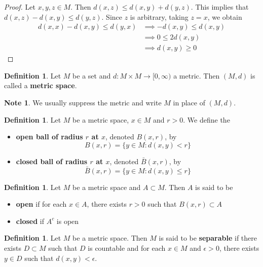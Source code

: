 \documentclass[12pt]{amsart}
\theoremstyle{definition}
\newtheorem{defn}[definition]{Definition}
\newtheorem{note}[definition]{Note}
\newcommand{\ep}{\epsilon}
\newcommand{\tbf}[1]{\textbf{#1}}
\newcommand{\Rg}{[0,\infty)}
\DeclareMathOperator*{\0}{\mbf{0}}
\DeclareMathOperator*{\1}{\mbf{1}}
\newcommand{\ld}[1]{\label{defn:#1}}
\begin{document}
	\begin{proof}
	Let $x, y, z \in M$. Then $d(x,z) \leq d(x, y) + d(y,z)$. This implies that $d(x,z) - d(x, y) \leq d(y, z)$. Since $z$ is arbitrary, taking $z=x$, we obtain 
	\begin{align*}
	d(x,x) - d(x, y) \leq d(y, x)
	& \implies - d(x, y) \leq d(x, y) \\
	& \implies 0 \leq 2 d(x,y) \\
	& \implies d(x,y) \geq 0
	\end{align*}
	\end{proof}	

	\begin{defn} \ld{}
		Let $M$ be a set and $d: M \times M \rightarrow \Rg$ a metric. Then $(M, d)$ is called a \tbf{metric space}.
	\end{defn}	
	
	\begin{note}
		We usually suppress the metric and write $M$ in place of $(M, d)$.
	\end{note}	

	\begin{defn}
		Let $M$ be a metric space, $x \in M$ and $r > 0$. We define the 
		\begin{itemize}
			\item \tbf{open ball of radius $r$ at $x$}, denoted $B(x, r)$, by $$B(x, r) = \{y \in M: d(x,y) < r\}$$
			\item \tbf{closed ball of radius $r$ at $x$}, denoted $\bar{B}(x, r)$, by $$\bar{B}(x, r) = \{y \in M: d(x,y) \leq r\}$$
		\end{itemize}
	\end{defn}

	\begin{defn}
		Let $M$ be a metric space and $A \subset M$. Then $A$ is said to be 
		\begin{itemize}
			\item \tbf{open} if for each $x \in A$, there exists $r > 0$ such that $B(x, r) \subset A$
			\item \tbf{closed} if $A^c$ is open
		\end{itemize}  
	\end{defn}

	\begin{defn}
		Let $M$ be a metric space. Then $M$ is said to be \tbf{separable} if there exists $D \subset M$ such that $D$ is countable and for each $x \in M$ and $\ep >0$, there exists $y \in D$ such that $d(x, y) < \ep$.
	\end{defn}
	
\end{document}
